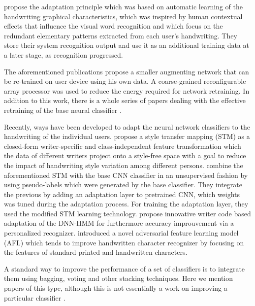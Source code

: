 \documentclass{article}
\begin{document}
\citet{nosary1, nosary2, nosary3} propose the adaptation principle which was based on automatic learning of the handwriting graphical characteristics, 
which was inspired by human contextual effects that influence the visual word recognition and which focus on the redundant elementary patterns extracted 
from each user's handwriting. They store their system recognition output and use it as an additional training data at a later stage, as recognition progressed. 

The aforementioned publications \citet{custom1, nist5} propose a smaller augmenting network that can be re-trained on user device using his own data. %
A coarse-grained reconfigurable array processor was used to reduce the energy required for network retraining.
In addition to this work, there is a whole series of papers dealing with the effective retraining of the base neural classifier \citep{custom2, custom4}. 

Recently, ways have been developed to adapt the neural network classifiers to the handwriting of the individual users. 
\citet{cnn0} propose a style transfer mapping (STM) as a closed-form writer-specific and class-independent feature transformation which the data of different writers project onto a style-free space 
with a goal to reduce the impact of handwriting style variation among different persons. 
\citet{cnn1, cnn2} combine the aforementioned STM with the base CNN classifier in an unsupervised fashion by using pseudo-labels which were generated by the base classifier. 
They integrate the previous by adding an adaptation layer to pretrained CNN, which weights was tuned during the adaptation process. 
For training the adaptation layer, they used the modified STM learning technology. 
\citet{cnn3} propose innovative writer code based adaptation of the DNN-HMM for furthermore accuracy improuvement via a personalized recognizer. 
\citet{cnn4} introduced a novel adversarial feature learning model (AFL) which tends to improve handwritten character recognizer 
by focusing on the features of standard printed and handwritten characters. 

A standard way to improve the performance of a set of classifiers is to integrate them using bagging, voting and other stacking techniques.
Here we mention papers of this type, although this is not essentially a work on improving a particular classifier \citep{imp3, imp1, imp2}.
\end{document}

